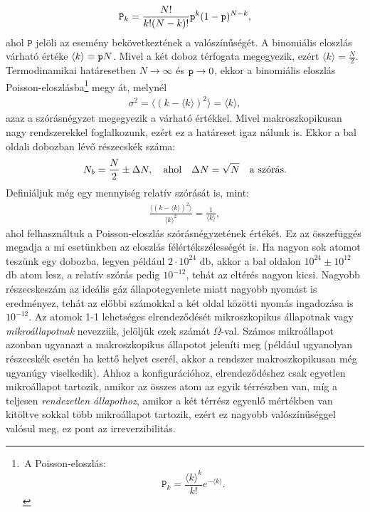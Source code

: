 \begin{align}
	\mathtt P_k = \frac{N!}{k!(N-k)!}\mathtt p^k (1-\mathtt p)^{N-k},
\end{align}
ahol $\mathtt P$ jelöli az esemény bekövetkeztének a valószínűségét.
A binomiális eloszlás várható értéke $\langle k\rangle = \mathtt p N$. Mivel a két doboz térfogata megegyezik, ezért $\langle k\rangle = \frac N2$. Termodinamikai határesetben $N \to \infty$ és $\mathtt p\to 0$, ekkor a binomiális eloszlás Poisson-eloszlásba\footnote{\,A Poisson-eloszlás:
$$ \mathtt P_k = \frac{\langle k\rangle ^k}{k!} e^{-\langle k \rangle}.$$} megy át, melynél
\begin{align}
	\sigma^2=\langle(k-\langle k \rangle)^2\rangle = \langle k \rangle,
\end{align}
azaz a szórásnégyzet megegyezik a várható értékkel. Mivel makroszkopikusan nagy rendszerekkel foglalkozunk, ezért ez a határeset igaz nálunk is.
Ekkor a bal oldali dobozban lévő részecskék száma:
\begin{align}
N_b = \frac N2 \pm \Delta N,\quad\textnormal{ahol}\quad \Delta N = \sqrt N \quad\textnormal{a szórás}. 
\end{align}
Definiáljuk még egy mennyiség relatív szórását is, mint:
\begin{align}
	\frac{\langle (k- \langle k \rangle)^2\rangle}{\langle k\rangle ^2} = \frac{1}{\langle k \rangle},
\end{align}
ahol felhasználtuk a Poisson-eloszlás szórásnégyzetének értékét. Ez az összefüggés megadja a mi esetünkben az eloszlás félértékszélességét is. Ha nagyon sok atomot teszünk egy dobozba, legyen például $2\cdot 10^{24}$ db, akkor a bal oldalon $10^{24}\pm 10^{12}$ db atom lesz, a relatív szórás pedig $10^{-12}$, tehát az eltérés nagyon kicsi. Nagyobb részecskeszám az ideális gáz állapotegyenlete miatt nagyobb nyomást is eredményez, tehát az előbbi számokkal a két oldal közötti nyomás ingadozása is $10^{-12}$. Az atomok 1-1 lehetséges elrendeződését mikroszkopikus állapotnak vagy \emph{mikroállapotnak} nevezzük, jelöljük ezek számát $\Omega$-val. Számos mikroállapot azonban ugyanazt a makroszkopikus állapotot jeleníti meg (például ugyanolyan részecskék esetén ha kettő helyet cserél, akkor a rendszer makroszkopikusan még ugyanúgy viselkedik). Ahhoz a konfigurációhoz, elrendeződéshez csak egyetlen mikroállapot tartozik, amikor az összes atom az egyik térrészben van, míg a teljesen \emph{rendezetlen állapothoz}, amikor a két térrész egyenlő mértékben van kitöltve sokkal több mikroállapot tartozik, ezért ez nagyobb valószínűséggel valósul meg, ez pont az irreverzibilitás. 
